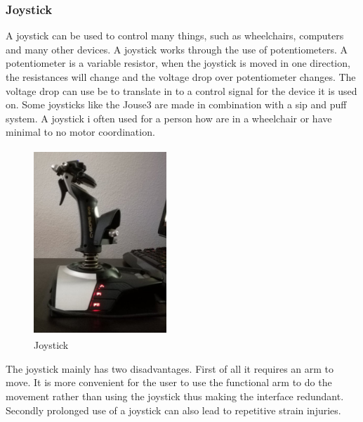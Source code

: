 \subsubsection*{Joystick}
A joystick can be used to control many things, such as wheelchairs, computers and many other devices. A joystick works through the use of potentiometers. A potentiometer is a variable resistor, when the joystick is moved in one direction, the resistances will change and the voltage drop over potentiometer changes. The voltage drop can use be to translate in to a control signal for the device it is used on. Some joysticks like the Jouse3 are made in combination with a sip and puff system\cite{Jouse}. A joystick i often used for a person how are in a wheelchair or have minimal to no motor coordination.\\ 
\begin{figure}[H]
    \centering
    \includegraphics[width=5cm,height=7cm]{Figures/Contextual_figures/Joystickl.jpg}
    \caption{Joystick}
    \label{fig:picjoystick}
\end{figure}
The joystick mainly has two disadvantages. First of all it requires an arm to move. It is more convenient for the user to use the functional arm to do the movement rather than using the joystick thus making the interface redundant. Secondly prolonged use of a joystick can also lead to repetitive strain injuries. 
